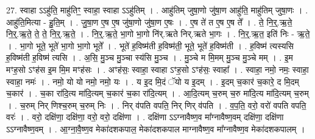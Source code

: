 \documentclass[17pt]{extarticle}
\begin{document}
27. स्वाहा ऽऽहु॑ति॒ माहु॑तिꣳ॒॒ स्वाहा॒ स्वाहा ऽऽहु॑तिम् । . आहु॑तिम् जुषा॒णो जु॑षा॒ण आहु॑ति॒ माहु॑तिम् जुषा॒णः । . आहु॑ति॒मित्या - हु॒ति॒म् । . जु॒षा॒ण ए॒ष ए॒ष जु॑षा॒णो जु॑षा॒ण ए॒षः । . ए॒ष ते॑ त ए॒ष ए॒ष ते᳚ । . ते॒ नि॒र्॒.ऋ॒ते॒ नि॒र्॒.ऋ॒ते॒ ते॒ ते॒ नि॒र्॒.ऋ॒ते॒ । . नि॒र्॒.ऋ॒ते॒ भा॒गो भा॒गो नि॑र्.ऋते निर्.ऋते भा॒गः । . नि॒र्॒.ऋ॒त॒ इति॑ निः - ऋ॒ते॒ । . भा॒गो भूते॒ भूते॑ भा॒गो भा॒गो भूते᳚ । . भूते॑ ह॒विष्म॑ती ह॒विष्म॑ती॒ भूते॒ भूते॑ ह॒विष्म॑ती । . ह॒विष्म॑ त्यस्यसि ह॒विष्म॑ती ह॒विष्म॑ त्यसि । . अ॒सि॒ मु॒ञ्च मु॒ञ्चा स्य॑सि मु॒ञ्च । . मु॒ञ्चे म मि॒मम् मु॒ञ्च मु॒ञ्चे मम् । . इ॒म मꣳह॒सो ऽꣳह॑स इ॒म मि॒म मꣳह॑सः । . अꣳह॑सः॒ स्वाहा॒ स्वाहा ऽꣳह॒सो ऽꣳह॑सः॒ स्वाहा᳚ । . स्वाहा॒ नमो॒ नमः॒ स्वाहा॒ स्वाहा॒ नमः॑ । . नमो॒ यो यो नमो॒ नमो॒ यः । . य इ॒द मि॒दं ॅयो य इ॒दम् । . इ॒दम् च॒कार॑ च॒कारे॒ द मि॒दम् च॒कार॑ । . च॒का रा॑दि॒त्य मा॑दि॒त्यम् च॒कार॑ च॒का रा॑दि॒त्यम् । . आ॒दि॒त्यम् च॒रुम् च॒रु मा॑दि॒त्य मा॑दि॒त्यम् च॒रुम् । . च॒रुम् निर् णिश्च॒रुम् च॒रुम् निः । . निर् व॑पति वपति॒ निर् णिर् व॑पति । . व॒प॒ति॒ वरो॒ वरो॑ वपति वपति॒ वरः॑ । . वरो॒ दक्षि॑णा॒ दक्षि॑णा॒ वरो॒ वरो॒ दक्षि॑णा । . दक्षि॑णा ऽऽग्नावैष्ण॒व मा᳚ग्नावैष्ण॒वम् दक्षि॑णा॒ दक्षि॑णा ऽऽग्नावैष्ण॒वम् । . आ॒ग्ना॒वै॒ष्ण॒व मेका॑दशकपाल॒ मेका॑दशकपाल माग्नावैष्ण॒व मा᳚ग्नावैष्ण॒व मेका॑दशकपालम् । \newline
\end{document}
